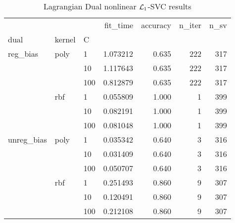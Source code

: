 \begin{table}[H]
\centering
\caption{Lagrangian Dual nonlinear $\protect \mathcal{L}_1$-SVC results}
\label{nonlinear_lagrangian_dual_l1_svc_cv_results}
\begin{tabular}{lllrrrr}
\toprule
           &     &     &  fit\_time &  accuracy &  n\_iter &  n\_sv \\
dual & kernel & C &           &           &         &       \\
\midrule
reg\_bias & poly & 1   &  1.073212 &     0.635 &     222 &   317 \\
           &     & 10  &  1.117643 &     0.635 &     222 &   317 \\
           &     & 100 &  0.812879 &     0.635 &     222 &   317 \\
           & rbf & 1   &  0.055809 &     1.000 &       1 &   399 \\
           &     & 10  &  0.082191 &     1.000 &       1 &   399 \\
           &     & 100 &  0.081048 &     1.000 &       1 &   399 \\
unreg\_bias & poly & 1   &  0.035342 &     0.640 &       3 &   316 \\
           &     & 10  &  0.031409 &     0.640 &       3 &   316 \\
           &     & 100 &  0.050707 &     0.640 &       3 &   316 \\
           & rbf & 1   &  0.251493 &     0.860 &       9 &   307 \\
           &     & 10  &  0.120491 &     0.860 &       9 &   307 \\
           &     & 100 &  0.212108 &     0.860 &       9 &   307 \\
\bottomrule
\end{tabular}
\end{table}
